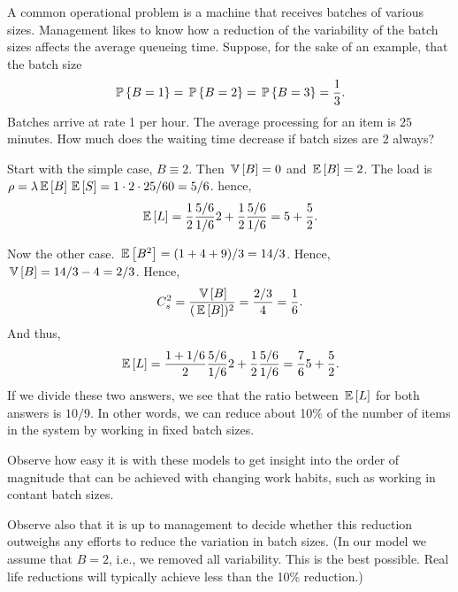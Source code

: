 \begin{question}
  A common operational problem is a machine that receives batches of
  various sizes. Management likes to know how a reduction of the
  variability of the batch sizes affects the average queueing time.
  Suppose, for the sake of an example, that the batch size 
  \begin{equation*}
    \P{B=1} = \P{B=2} = \P{B=3} = \frac 13.
  \end{equation*}
  Batches arrive at rate 1 per hour. The average processing for an
  item is $25$ minutes.  How much does the waiting time decrease if
  batch sizes are $2$ always?

  \begin{solution}
    Start with the simple case, $B\equiv 2$. Then $\V{B}=0$ and
    $\E B = 2$. The load is $\rho=\lambda \E B \E S = 1\cdot 2 \cdot 25/60 = 5/6$.  hence,
    \begin{equation*}
      \E{L} = \frac 12 \frac{5/6}{1/6} 2 + \frac 12 \frac{5/6}{1/6} = 5 + \frac52.
    \end{equation*}

Now the other case. $\E{B^2} = (1+4+9)/3 = 14/3$. Hence, $\V B=14/3 - 4=2/3$. Hence, 
\begin{equation*}
C_s^2=\frac{\V B}{(\E B)^2} = \frac{2/3}4 = \frac 16.
\end{equation*}
And thus, 
    \begin{equation*}
      \E{L} = \frac {1+1/6}2 \frac{5/6}{1/6} 2 + \frac 12 \frac{5/6}{1/6} = \frac76 5 + \frac 52.
    \end{equation*}
    If we divide these two answers, we see that the ratio between
    $\E{L}$ for both answers is $10/9$. In other words, we can
    reduce about 10\% of the number of items in the system by working
    in fixed batch sizes. 

    Observe how easy it is with these models to get insight into the
    order of magnitude that can be achieved with changing work habits,
    such as working in contant batch sizes. 

    Observe also that it is up to management to decide whether this
    reduction outweighs any efforts to reduce the variation in batch
    sizes. (In our model we assume that $B=2$, i.e., we removed all
    variability. This is the best possible. Real life reductions will
    typically achieve less than the 10\% reduction.)
  \end{solution}
\end{question}



